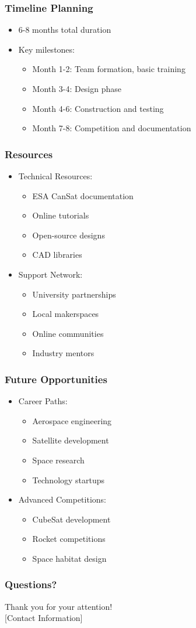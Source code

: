 \documentclass{beamer}
\begin{document}
\begin{frame}
\frametitle{Timeline Planning}
\begin{itemize}
\item 6-8 months total duration
\item Key milestones:
    \begin{itemize}
    \item Month 1-2: Team formation, basic training
    \item Month 3-4: Design phase
    \item Month 4-6: Construction and testing
    \item Month 7-8: Competition and documentation
    \end{itemize}
\end{itemize}
\end{frame}

\begin{frame}
\frametitle{Resources}
\begin{itemize}
\item Technical Resources:
    \begin{itemize}
    \item ESA CanSat documentation
    \item Online tutorials
    \item Open-source designs
    \item CAD libraries
    \end{itemize}
\item Support Network:
    \begin{itemize}
    \item University partnerships
    \item Local makerspaces
    \item Online communities
    \item Industry mentors
    \end{itemize}
\end{itemize}
\end{frame}

\begin{frame}
\frametitle{Future Opportunities}
\begin{itemize}
\item Career Paths:
    \begin{itemize}
    \item Aerospace engineering
    \item Satellite development
    \item Space research
    \item Technology startups
    \end{itemize}
\item Advanced Competitions:
    \begin{itemize}
    \item CubeSat development
    \item Rocket competitions
    \item Space habitat design
    \end{itemize}
\end{itemize}
\end{frame}

\begin{frame}
\frametitle{Questions?}
\begin{center}
Thank you for your attention!\\
\vspace{1cm}
[Contact Information]
\end{center}
\end{frame}
\end{document}
